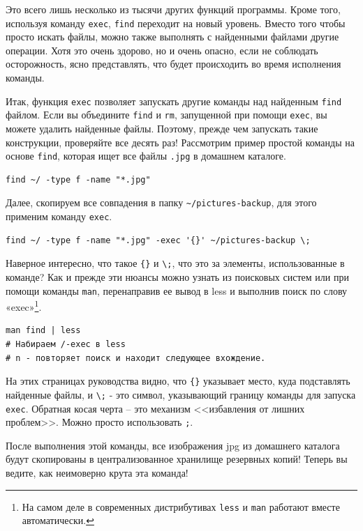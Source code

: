 \documentclass[12pt]{article}
\begin{document}
Это всего лишь несколько из тысячи других функций программы. Кроме того,
используя команду \texttt{exec}, \texttt{find} переходит на новый
уровень. Вместо того чтобы просто искать файлы, можно также выполнять с
найденными файлами другие операции. Хотя это очень здорово, но и очень опасно, если не
соблюдать осторожность, ясно представлять, что будет происходить во
время исполнения команды.

Итак, функция \texttt{exec} позволяет запускать другие
команды над найденным \texttt{find} файлом. Если вы объедините
\texttt{find} и \texttt{rm}, запущенной при помощи \texttt{exec}, вы
можете удалить найденные файлы. Поэтому, прежде чем запускать такие
конструкции, проверяйте все десять раз!
Рассмотрим пример простой команды на основе \texttt{find}, которая ищет все файлы \texttt{.jpg} в
домашнем каталоге.

\begin{verbatim}
find ~/ -type f -name "*.jpg"
\end{verbatim}
Далее, скопируем все совпадения в папку
\texttt{\textasciitilde{}/pictures-backup}, для этого применим команду \texttt{exec}.

\begin{verbatim}
find ~/ -type f -name "*.jpg" -exec '{}' ~/pictures-backup \;
\end{verbatim}

Наверное интересно, что такое
\texttt{\textquotesingle{}\{\}\textquotesingle{}} и
\texttt{\textbackslash{};}, что это за элементы, использованные в
команде? Как и прежде эти нюансы можно узнать из поисковых систем или
при помощи команды \texttt{man}, перенаправив ее вывод в less и
выполнив поиск по слову «exec»\footnote{На самом деле в современных дистрибутивах \texttt{less} и \texttt{man} работают вместе автоматически.}.

\begin{verbatim}
man find | less
# Набираем /-exec в less
# n - повторяет поиск и находит следующее вхождение.
\end{verbatim}

На этих страницах руководства видно, что
\texttt{\textquotesingle{}\{\}\textquotesingle{}} указывает место, куда
подставлять найденные файлы, и \texttt{\textbackslash{};} - это символ,
указывающий границу команды для запуска \texttt{exec}. Обратная косая
черта -- это механизм <<избавления от лишних проблем>>. Можно просто
использовать \texttt{\textquotesingle{};\textquotesingle{}}.

После выполнения этой команды, все изображения jpg из домашнего каталога
будут скопированы в централизованное хранилище резервных копий! Теперь
вы ведите, как неимоверно крута эта команда!
\end{document}

